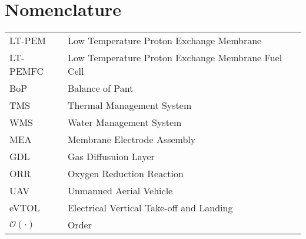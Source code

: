 \section{Nomenclature}

 {
  \renewcommand\arraystretch{1.0}
  \noindent\begin{longtable*}{@{}l @{\quad=\quad} l@{}}
	  LT-PEM  & Low Temperature Proton Exchange Membrane \\
	  LT-PEMFC  & Low Temperature Proton Exchange Membrane Fuel Cell\\
	  BoP &    Balance of Pant \\
	  TMS & Thermal Management System \\
	  WMS & Water Management System \\
	  MEA & Membrane Electrode Assembly \\
	  GDL & Gas Diffusuion Layer \\
	  ORR & Oxygen Reduction Reaction \\
	  UAV & Unmanned Aerial Vehicle \\
	  eVTOL & Electrical Vertical Take-off and Landing\\
	  $\mathcal{O}(\cdot)$ & Order \\
  \end{longtable*}
 }

